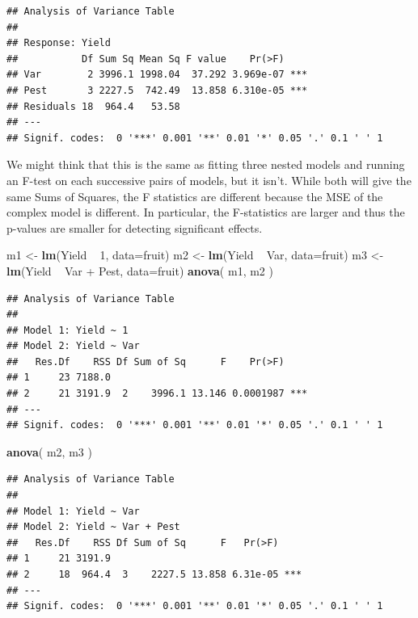\documentclass[]{book}
\newenvironment{Shaded}{\begin{snugshade}}{\end{snugshade}}
\newcommand{\KeywordTok}[1]{\textcolor[rgb]{0.13,0.29,0.53}{\textbf{{#1}}}}
\newcommand{\DataTypeTok}[1]{\textcolor[rgb]{0.13,0.29,0.53}{{#1}}}
\newcommand{\DecValTok}[1]{\textcolor[rgb]{0.00,0.00,0.81}{{#1}}}
\newcommand{\StringTok}[1]{\textcolor[rgb]{0.31,0.60,0.02}{{#1}}}
\newcommand{\NormalTok}[1]{{#1}}
\theoremstyle{definition}
\theoremstyle{definition}
\theoremstyle{remark}
\begin{document}
\begin{verbatim}
## Analysis of Variance Table
## 
## Response: Yield
##           Df Sum Sq Mean Sq F value    Pr(>F)    
## Var        2 3996.1 1998.04  37.292 3.969e-07 ***
## Pest       3 2227.5  742.49  13.858 6.310e-05 ***
## Residuals 18  964.4   53.58                      
## ---
## Signif. codes:  0 '***' 0.001 '**' 0.01 '*' 0.05 '.' 0.1 ' ' 1
\end{verbatim}

We might think that this is the same as fitting three nested models and
running an F-test on each successive pairs of models, but it isn't.
While both will give the same Sums of Squares, the F statistics are
different because the MSE of the complex model is different. In
particular, the F-statistics are larger and thus the p-values are
smaller for detecting significant effects.

\begin{Shaded}
\begin{Highlighting}[]
\NormalTok{m1 <-}\StringTok{ }\KeywordTok{lm}\NormalTok{(Yield ~}\StringTok{ }\DecValTok{1}\NormalTok{, }\DataTypeTok{data=}\NormalTok{fruit)}
\NormalTok{m2 <-}\StringTok{ }\KeywordTok{lm}\NormalTok{(Yield ~}\StringTok{ }\NormalTok{Var, }\DataTypeTok{data=}\NormalTok{fruit)}
\NormalTok{m3 <-}\StringTok{ }\KeywordTok{lm}\NormalTok{(Yield ~}\StringTok{ }\NormalTok{Var +}\StringTok{ }\NormalTok{Pest, }\DataTypeTok{data=}\NormalTok{fruit)}
\KeywordTok{anova}\NormalTok{( m1, m2 )}
\end{Highlighting}
\end{Shaded}

\begin{verbatim}
## Analysis of Variance Table
## 
## Model 1: Yield ~ 1
## Model 2: Yield ~ Var
##   Res.Df    RSS Df Sum of Sq      F    Pr(>F)    
## 1     23 7188.0                                  
## 2     21 3191.9  2    3996.1 13.146 0.0001987 ***
## ---
## Signif. codes:  0 '***' 0.001 '**' 0.01 '*' 0.05 '.' 0.1 ' ' 1
\end{verbatim}

\begin{Shaded}
\begin{Highlighting}[]
\KeywordTok{anova}\NormalTok{( m2, m3 )}
\end{Highlighting}
\end{Shaded}

\begin{verbatim}
## Analysis of Variance Table
## 
## Model 1: Yield ~ Var
## Model 2: Yield ~ Var + Pest
##   Res.Df    RSS Df Sum of Sq      F   Pr(>F)    
## 1     21 3191.9                                 
## 2     18  964.4  3    2227.5 13.858 6.31e-05 ***
## ---
## Signif. codes:  0 '***' 0.001 '**' 0.01 '*' 0.05 '.' 0.1 ' ' 1
\end{verbatim}
\end{document}
